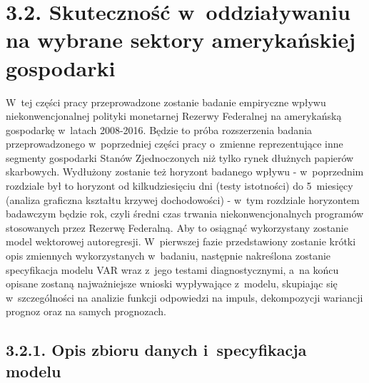 \hypertarget{podrz32}{}
\section*{\large{3.2. Skuteczność w~oddziaływaniu na wybrane sektory amerykańskiej gospodarki}}

W~tej części pracy przeprowadzone zostanie badanie empiryczne wpływu niekonwencjonalnej polityki monetarnej Rezerwy Federalnej na amerykańską gospodarkę w~latach 2008-2016. Będzie to próba rozszerzenia badania przeprowadzonego w~poprzedniej części pracy o~zmienne reprezentujące inne segmenty gospodarki Stanów Zjednoczonych niż tylko rynek dłużnych papierów skarbowych. Wydłużony zostanie też horyzont badanego wpływu - w~poprzednim rozdziale był to horyzont od kilkudziesięciu dni (testy istotności) do 5~miesięcy (analiza graficzna kształtu krzywej dochodowości) - w~tym rozdziale horyzontem badawczym będzie rok, czyli średni czas trwania niekonwencjonalnych programów stosowanych przez Rezerwę Federalną. Aby to osiągnąć wykorzystany zostanie model wektorowej autoregresji. W~pierwszej fazie przedstawiony zostanie krótki opis zmiennych wykorzystanych w~badaniu, następnie nakreślona zostanie specyfikacja modelu \acs{VAR} wraz z~jego testami diagnostycznymi, a~na końcu opisane zostaną najważniejsze wnioski wypływające z~modelu, skupiając się w~szczególności na analizie funkcji odpowiedzi na impuls, dekompozycji wariancji prognoz oraz na samych prognozach.

\subsection*{\normalsize{3.2.1. Opis zbioru danych i~specyfikacja modelu}}
\vspace{0.4cm}

